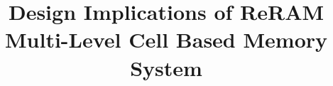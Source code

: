 \documentclass[10pt,letterpaper,conference]{IEEEtran}
\begin{document}
\title{Design Implications of ReRAM Multi-Level Cell Based Memory System\vspace{-10pt}}

\maketitle



%
%
%
%



\end{document}

